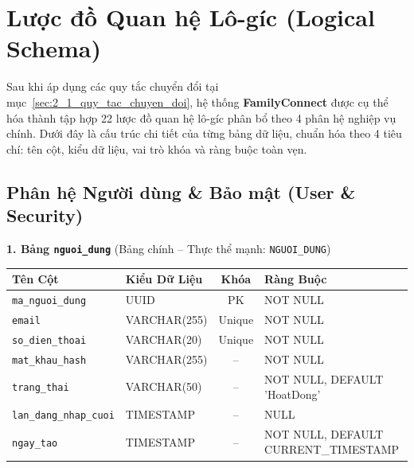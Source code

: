 \section{Lược đồ Quan hệ Lô-gíc (Logical Schema)}
\label{sec:2_2_luoc_do_quan_he}

Sau khi áp dụng các quy tắc chuyển đổi tại mục~\ref{sec:2_1_quy_tac_chuyen_doi}, hệ thống \textbf{FamilyConnect} được cụ thể hóa thành tập hợp 22 lược đồ quan hệ lô-gíc phân bổ theo 4 phân hệ nghiệp vụ chính. Dưới đây là cấu trúc chi tiết của từng bảng dữ liệu, chuẩn hóa theo 4 tiêu chí: tên cột, kiểu dữ liệu, vai trò khóa và ràng buộc toàn vẹn.

\subsection{Phân hệ Người dùng \& Bảo mật (User \& Security)}
\label{subsec:2_2_1_user_security}

\noindent\textbf{1. Bảng \texttt{nguoi\_dung}} \quad (Bảng chính -- Thực thể mạnh: \texttt{NGUOI\_DUNG})
\vspace{0.2cm}

\begin{center}
\small
\renewcommand{\arraystretch}{1.2}
\begin{tabular}{|p{3.8cm}|p{2.5cm}|c|p{6.5cm}|}
\hline
\textbf{Tên Cột} & \textbf{Kiểu Dữ Liệu} & \textbf{Khóa} & \textbf{Ràng Buộc} \\ \hline
\texttt{ma\_nguoi\_dung} & UUID & PK & NOT NULL \\ \hline
\texttt{email} & VARCHAR(255) & Unique & NOT NULL \\ \hline
\texttt{so\_dien\_thoai} & VARCHAR(20) & Unique & NOT NULL \\ \hline
\texttt{mat\_khau\_hash} & VARCHAR(255) & -- & NOT NULL \\ \hline
\texttt{trang\_thai} & VARCHAR(50) & -- & NOT NULL, DEFAULT 'HoatDong' \\ \hline
\texttt{lan\_dang\_nhap\_cuoi} & TIMESTAMP & -- & NULL \\ \hline
\texttt{ngay\_tao} & TIMESTAMP & -- & NOT NULL, DEFAULT CURRENT\_TIMESTAMP \\ \hline
\end{tabular}
\end{center}
\vspace{0.3cm}

